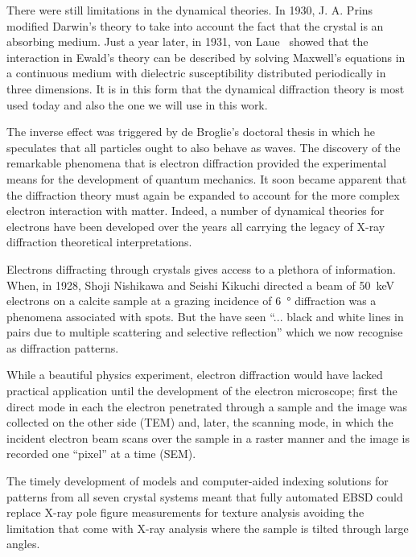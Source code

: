 There were still limitations in the dynamical theories. In 1930, J. A. Prins~\cite{Prins30} modified Darwin's theory to take into account the fact that the crystal is an absorbing medium. Just a year later, in 1931, von Laue~\cite{Laue31} showed that the interaction in Ewald's theory can be described by solving Maxwell's equations in a continuous medium with dielectric susceptibility distributed periodically in three dimensions. It is in this form that the dynamical diffraction theory is most used today and also the one we will use in this work.
  
The inverse effect was triggered by de Broglie's doctoral thesis in which he speculates that all particles ought to also behave as waves. The discovery of the remarkable phenomena that is electron diffraction provided the experimental means for the development of quantum mechanics. It soon became apparent that the diffraction theory must again be expanded to account for the more complex electron interaction with matter. Indeed, a number of dynamical theories for electrons have been developed over the years all carrying the legacy of X-ray diffraction theoretical interpretations.   

Electrons diffracting through crystals gives access to a plethora of information. When, in 1928, Shoji Nishikawa and Seishi Kikuchi directed a beam of \SI{50}{\kilo \electronvolt} electrons on a calcite sample at a grazing incidence of \SI{6}{\degree} diffraction was a phenomena associated with spots. But the have seen ``... black and white lines in pairs due to multiple scattering and selective reflection'' which we now recognise as diffraction patterns. 

While a beautiful physics experiment, electron diffraction would have lacked practical application until the development of the electron microscope; first the direct mode in each the electron penetrated through a sample and the image was collected on the other side (TEM) and, later, the scanning mode, in which the incident electron beam scans over the sample in a raster manner and the image is recorded one ``pixel'' at a time (SEM). 

The timely development of models and computer-aided indexing solutions for patterns from all seven crystal systems meant that fully automated EBSD could replace X-ray pole figure measurements for texture analysis avoiding the limitation that come with X-ray analysis where the sample is tilted through large angles. 


